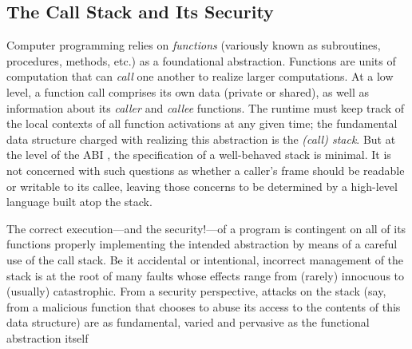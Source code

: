 \subsection{The Call Stack and Its Security}


Computer programming %
relies on \emph{functions} (variously known as
subroutines, procedures, methods, etc.) as a foundational abstraction.
Functions are units of computation that
can \emph{call} one another to realize larger computations.
%
At a low level, a function call  comprises its own data (private or shared), as
well as information about its \emph{caller} and \emph{callee} functions. The
runtime must keep track of the local contexts  of all function activations
at any given time; the fundamental data structure charged with realizing
this abstraction is the \emph{(call) stack}. But at the level of the ABI
, the specification of a well-behaved
stack is minimal. It is not concerned with such questions as whether a caller's
frame should be readable or writable to its callee, leaving those concerns
to be determined by a high-level language built atop the stack.

The correct execution---and the security!---of a program is contingent on all of
its functions properly implementing the intended abstraction by means of a careful use
of the call stack. Be it accidental or intentional, incorrect management of the
stack is at the root of many faults whose effects range from (rarely)
innocuous to (usually) catastrophic.
%
From a security perspective, attacks on the stack (say, from a malicious
function that chooses to abuse its access to the contents of this data
structure) are as fundamental, varied and pervasive as the functional
abstraction itself
%



